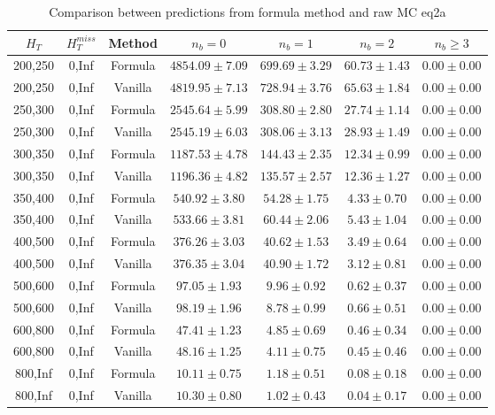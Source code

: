 \begin{longtable}{ | c | c | c | c | c | c | c | }
\caption{Comparison between predictions from formula method and raw MC eq2a} \label{tab:eq2a} \\    \hline 
$H_{T}$ & $H_{T}^{miss}$ & Method & $n_{b} = 0$ & $n_{b} = 1$ & $n_{b} = 2$ & $n_{b} \ge 3$ \\ \hline200,250 & 0,Inf & Formula  & $  4854.09 \pm  7.09 $ & $   699.69 \pm  3.29 $ & $    60.73 \pm  1.43 $ & $     0.00 \pm  0.00 $  \\  
200,250 & 0,Inf & Vanilla  & $  4819.95 \pm  7.13 $ & $   728.94 \pm  3.76 $ & $    65.63 \pm  1.84 $ & $     0.00 \pm  0.00 $  \\ \hline 
250,300 & 0,Inf & Formula  & $  2545.64 \pm  5.99 $ & $   308.80 \pm  2.80 $ & $    27.74 \pm  1.14 $ & $     0.00 \pm  0.00 $  \\  
250,300 & 0,Inf & Vanilla  & $  2545.19 \pm  6.03 $ & $   308.06 \pm  3.13 $ & $    28.93 \pm  1.49 $ & $     0.00 \pm  0.00 $  \\ \hline 
300,350 & 0,Inf & Formula  & $  1187.53 \pm  4.78 $ & $   144.43 \pm  2.35 $ & $    12.34 \pm  0.99 $ & $     0.00 \pm  0.00 $  \\  
300,350 & 0,Inf & Vanilla  & $  1196.36 \pm  4.82 $ & $   135.57 \pm  2.57 $ & $    12.36 \pm  1.27 $ & $     0.00 \pm  0.00 $  \\ \hline 
350,400 & 0,Inf & Formula  & $   540.92 \pm  3.80 $ & $    54.28 \pm  1.75 $ & $     4.33 \pm  0.70 $ & $     0.00 \pm  0.00 $  \\  
350,400 & 0,Inf & Vanilla  & $   533.66 \pm  3.81 $ & $    60.44 \pm  2.06 $ & $     5.43 \pm  1.04 $ & $     0.00 \pm  0.00 $  \\ \hline 
400,500 & 0,Inf & Formula  & $   376.26 \pm  3.03 $ & $    40.62 \pm  1.53 $ & $     3.49 \pm  0.64 $ & $     0.00 \pm  0.00 $  \\  
400,500 & 0,Inf & Vanilla  & $   376.35 \pm  3.04 $ & $    40.90 \pm  1.72 $ & $     3.12 \pm  0.81 $ & $     0.00 \pm  0.00 $  \\ \hline 
500,600 & 0,Inf & Formula  & $    97.05 \pm  1.93 $ & $     9.96 \pm  0.92 $ & $     0.62 \pm  0.37 $ & $     0.00 \pm  0.00 $  \\  
500,600 & 0,Inf & Vanilla  & $    98.19 \pm  1.96 $ & $     8.78 \pm  0.99 $ & $     0.66 \pm  0.51 $ & $     0.00 \pm  0.00 $  \\ \hline 
600,800 & 0,Inf & Formula  & $    47.41 \pm  1.23 $ & $     4.85 \pm  0.69 $ & $     0.46 \pm  0.34 $ & $     0.00 \pm  0.00 $  \\  
600,800 & 0,Inf & Vanilla  & $    48.16 \pm  1.25 $ & $     4.11 \pm  0.75 $ & $     0.45 \pm  0.46 $ & $     0.00 \pm  0.00 $  \\ \hline 
800,Inf & 0,Inf & Formula  & $    10.11 \pm  0.75 $ & $     1.18 \pm  0.51 $ & $     0.08 \pm  0.18 $ & $     0.00 \pm  0.00 $  \\  
800,Inf & 0,Inf & Vanilla  & $    10.30 \pm  0.80 $ & $     1.02 \pm  0.43 $ & $     0.04 \pm  0.17 $ & $     0.00 \pm  0.00 $  \\ \hline 
    \hline 
    \hline 
\end{longtable}
